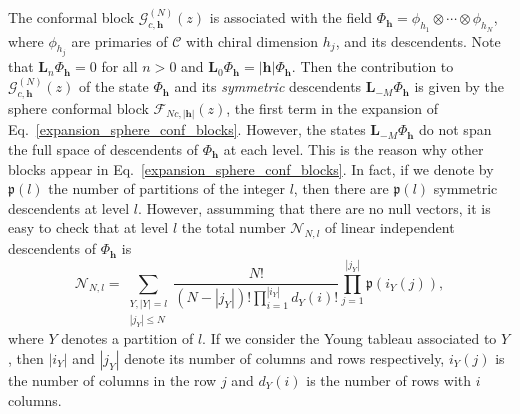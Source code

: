 \documentclass[a4paper,11pt]{article}
\begin{document}
The conformal block $\mathcal{G}_{c, \boldsymbol{h}}^{(N)}(z)$ is associated with 
the field $\Phi_{\boldsymbol{h}}=\phi_{h_1}\otimes\cdots\otimes \phi_{h_N}$, where $\phi_{h_j}$ are 
primaries of $\mathcal{C}$ with chiral dimension $h_j$, and its descendents. 
Note that $\boldsymbol{L}_n\Phi_{\boldsymbol{h}}=0$ for all $n>0$ and $\boldsymbol{L}_0\Phi_{\boldsymbol{h}}=|\boldsymbol{h}| \Phi_{\boldsymbol{h}}$.
Then the contribution to $\mathcal{G}_{c, \boldsymbol{h}}^{(N)}(z)$ of the 
state $\Phi_{\boldsymbol{h}}$ and its \textit{symmetric} descendents $\boldsymbol{L}_{-M}\Phi_{\boldsymbol{h}}$ is given by 
the sphere conformal block $\mathcal{F}_{Nc, |\boldsymbol{h}|}(z)$, the first term
in the expansion of Eq.~\eqref{expansion_sphere_conf_blocks}. However, the states 
$\boldsymbol{L}_{-M}\Phi_{\boldsymbol{h}}$ do not span the full space of descendents of $\Phi_{\boldsymbol{h}}$ at each level. This is the reason why
other blocks appear in Eq.~\eqref{expansion_sphere_conf_blocks}. In fact, if we denote by $\mathfrak{p}(l)$
the number of partitions of the integer $l$, then there are $\mathfrak{p}(l)$ symmetric
descendents at level $l$. However, assumming that there are no null vectors, it is easy to check that 
at level $l$ the total number $\mathcal{N}_{N, l}$ of linear independent descendents of $\Phi_{\boldsymbol{h}}$ is
\begin{equation}
 \mathcal{N}_{N, l}=\sum_{\substack{Y, |Y|=l \\ |j_Y|\leq N}}\frac{N!}{(N-|j_Y|)!
 \prod_{i=1}^{|i_Y|}d_Y(i)!}\prod_{j=1}^{|j_Y|}\mathfrak{p}(i_Y(j)),
\end{equation}
where $Y$ denotes a partition of $l$. If we consider the Young tableau
associated to $Y$, then $|i_Y|$ and  $|j_Y|$ denote its number of columns and
rows respectively, $i_Y(j)$ is the number of columns in the row $j$ and 
$d_Y(i)$ is the number of rows with $i$ columns.
\end{document}

